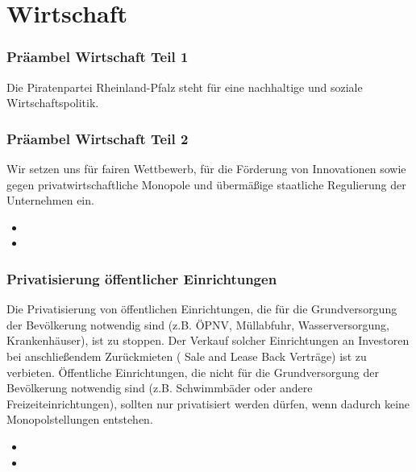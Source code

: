 \section{Wirtschaft}


\subsubsection{Präambel Wirtschaft Teil 1}
\abstimmung
Die Piratenpartei Rheinland-Pfalz steht für eine nachhaltige und soziale Wirtschaftspolitik.

\subsubsection{Präambel Wirtschaft Teil 2}
\abstimmung
Wir setzen uns für fairen Wettbewerb, für die Förderung von Innovationen sowie gegen privatwirtschaftliche Monopole und übermäßige staatliche Regulierung der Unternehmen ein.
 
\label{wp:wirt:privat1}
\begin{itemize}
\item {}
\item {}
\end{itemize}

\subsubsection{Privatisierung öffentlicher Einrichtungen}
\abstimmung
Die Privatisierung von öffentlichen Einrichtungen, die für die Grundversorgung der Bevölkerung notwendig sind (z.B. ÖPNV, Müllabfuhr, Wasserversorgung, Krankenhäuser), ist zu stoppen. Der Verkauf solcher Einrichtungen an Investoren bei anschließendem Zurückmieten ( Sale and Lease Back Verträge) ist zu verbieten. Öffentliche Einrichtungen, die nicht für die Grundversorgung der Bevölkerung notwendig sind (z.B. Schwimmbäder oder andere Freizeiteinrichtungen), sollten nur privatisiert werden dürfen, wenn dadurch keine Monopolstellungen entstehen.
 
\label{wp:wirt:privat2}
\begin{itemize}
\item {}
\item {}
\end{itemize}

